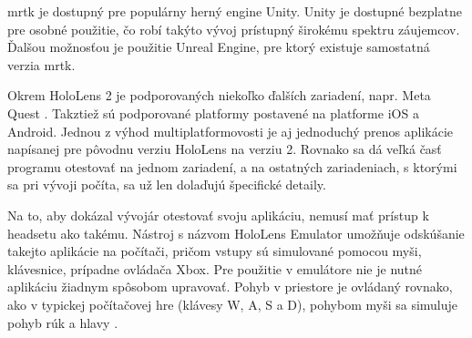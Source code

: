\acrshort{mrtk} je dostupný pre populárny herný engine Unity. Unity je dostupné bezplatne pre osobné použitie, čo robí takýto vývoj prístupný širokému spektru záujemcov.
Ďalšou možnosťou je použitie Unreal Engine, pre ktorý existuje samostatná verzia \acrshort{mrtk}.

Okrem HoloLens 2 je podporovaných niekoľko ďalších zariadení, napr. Meta Quest \cite{microsoftWhatMixedReality}. Takztiež sú podporované platformy postavené na platforme
iOS a Android. Jednou z výhod multiplatformovosti je aj jednoduchý prenos aplikácie napísanej pre pôvodnu verziu HoloLens na verziu 2. Rovnako sa dá veľká časť programu
otestovať na jednom zariadení, a na ostatných zariadeniach, s ktorými sa pri vývoji počíta, sa už len dolaďujú špecifické detaily.

Na to, aby dokázal vývojár otestovať svoju aplikáciu, nemusí mať prístup k headsetu ako takému. Nástroj s názvom HoloLens Emulator umožňuje odskúšanie takejto aplikácie 
na počítači, pričom vstupy sú simulované pomocou myši, klávesnice, prípadne ovládača Xbox. Pre použitie v emulátore nie je nutné aplikáciu žiadnym spôsobom upravovať. 
Pohyb v priestore je ovládaný rovnako, ako v typickej počítačovej hre (klávesy W, A, S a D), pohybom myši sa simuluje pohyb rúk a hlavy \cite{microsoftUsingHoloLensEmulator}.



